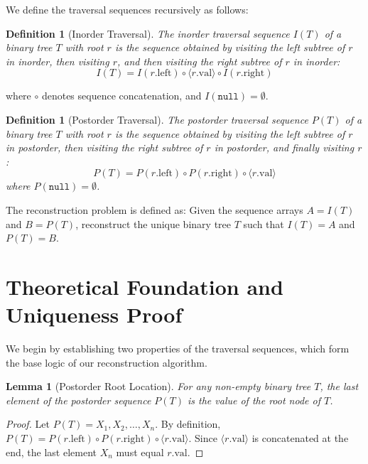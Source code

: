 \documentclass[10pt,journal,compsoc,onecolumn]{IEEEtran}
\newtheorem{lemma}[theorem]{Lemma}
\newtheorem{definition}[theorem]{Definition}
\begin{document}
We define the traversal sequences recursively as follows:
\begin{definition}[Inorder Traversal]
The inorder traversal sequence $I(T)$ of a binary tree $T$ with root $r$ is the sequence obtained by visiting the left subtree of $r$ in inorder, then visiting $r$, and then visiting the right subtree of $r$ in inorder:
\[
I(T) = I(r.\text{left}) \circ \langle r.\text{val} \rangle \circ I(r.\text{right})
\]
\end{definition}
where $\circ$ denotes sequence concatenation, and $I(\texttt{null}) = \emptyset$.

\begin{definition}[Postorder Traversal]
The postorder traversal sequence $P(T)$ of a binary tree $T$ with root $r$ is the sequence obtained by visiting the left subtree of $r$ in postorder, then visiting the right subtree of $r$ in postorder, and finally visiting $r$:
\[
P(T) = P(r.\text{left}) \circ P(r.\text{right}) \circ \langle r.\text{val} \rangle
\]
where $P(\texttt{null}) = \emptyset$.
\end{definition}

The reconstruction problem is defined as: Given the sequence arrays $A = I(T)$ and $B = P(T)$, reconstruct the unique binary tree $T$ such that $I(T) = A$ and $P(T) = B$.

\section{Theoretical Foundation and Uniqueness Proof}
\label{sec:theory}

We begin by establishing two properties of the traversal sequences, which form the base logic of our reconstruction algorithm.

\begin{lemma}[Postorder Root Location]
\label{lem:root}
For any non-empty binary tree $T$, the last element of the postorder sequence $P(T)$ is the value of the root node of $T$.
\end{lemma}
\begin{proof}
Let $P(T) = X_1, X_2, \dots, X_n$. By definition, $P(T) = P(r.\text{left}) \circ P(r.\text{right}) \circ \langle r.\text{val} \rangle$. Since $\langle r.\text{val} \rangle$ is concatenated at the end, the last element $X_n$ must equal $r.\text{val}$.
\end{proof}
\end{document}
